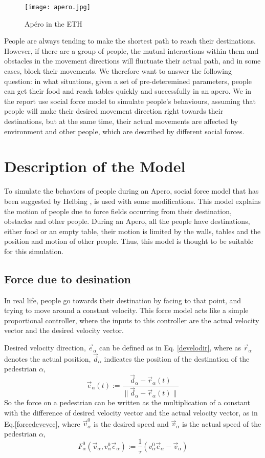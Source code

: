 \documentclass[11pt]{article}
\begin{document}
\begin{figure}[h!]
\centering
\texttt{[image: apero.jpg]}
\caption{Apéro in the ETH}
\label{fig:apero}
\end{figure}

People are always tending to make the shortest path to reach their destinations. However, if there are a group of people, the mutual interactions within them and obstacles in the movement directions will fluctuate their actual path, and in some cases, block their movements. We therefore want to answer the following question: in what situations, given a set of pre-deteremined parameters, people can get their food and reach tables quickly and successfully in an apero. We in the report use social force model to simulate people's behaviours, assuming that people will make their desired movement direction right towards their destinations, but at the same time, their actual movements are affected by environment and other people, which are described by different social forces.
\section{Description of the Model}
To simulate the behaviors of people during an Apero, social force model that has been suggested by Helbing \cite{Socialforce}, is used with some modifications. This model explains the motion of people due to force fields occurring from their destination, obstacles and other people. During an Apero, all the people have destinations, either food or an empty table, their motion is limited by the walls, tables and the position and motion of other people. Thus, this model is thought to be suitable for this simulation.
\subsection{Force due to desination}
In real life, people go towards their destination by facing to that point, and trying to move around a constant velocity. This force model acts like a simple proportional controller, where the inputs to this controller are the actual velocity vector and the desired velocity vector.

Desired velocity direction, $\vec{e}_\alpha$ can be defined as in Eq. \ref{develodir}, where as $\vec{r}_\alpha$ denotes the actual position,  $\vec{d}_\alpha$ indicates the position of the destination of the pedestrian $\alpha$,
\begin{equation}
    \vec{e}_\alpha(t):=\frac{\vec{d}_\alpha-\vec{r}_\alpha(t)}{\| \vec{d}_\alpha-\vec{r}_\alpha(t) \|}
\label{develodir}
\end{equation}
So the force on a pedestrian can be written as the multiplication of a constant with the difference of desired velocity vector and the actual velocity vector, as in Eq.\ref{forcedevevec}, where $\vec{v}_\alpha^0$ is the desired speed and $\vec{v}_\alpha$ is the actual speed of the pedestrian $\alpha$,
\begin{equation}
    F_\alpha^0(\vec{v}_\alpha,v_\alpha^0\vec{e}_\alpha) := \frac{1}{\tau}(v_\alpha^0\vec{e}_\alpha-\vec{v}_\alpha)
\label{forcedevevec}
\end{equation}
\end{document}
